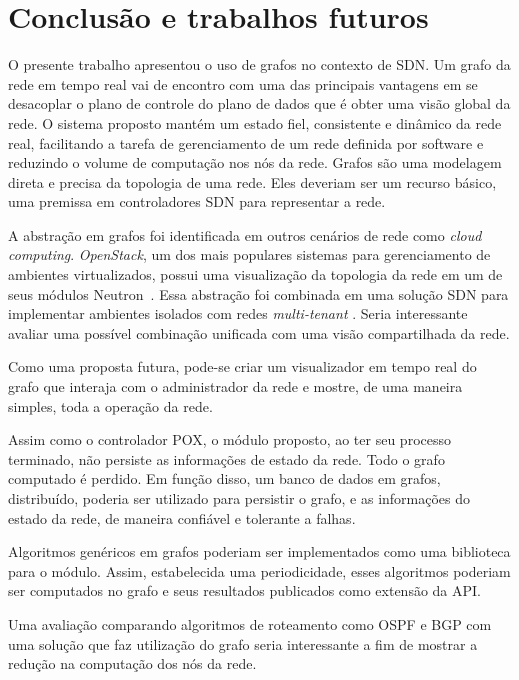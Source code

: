 \chapter{Conclusão e trabalhos futuros}

O presente trabalho apresentou o uso de grafos no contexto de SDN.
Um grafo da rede em tempo real vai de encontro com uma das principais 
vantagens em se desacoplar o plano de controle do plano de dados que é obter 
uma visão global da rede.
O sistema proposto mantém um estado fiel, consistente e dinâmico da rede real, 
facilitando a tarefa de gerenciamento de um rede definida por software e 
reduzindo o volume de computação nos nós da rede.
Grafos são uma modelagem direta e precisa da topologia de uma rede. 
Eles deveriam ser um recurso básico, uma premissa em controladores SDN para 
representar a rede.

A abstração em grafos foi identificada em outros cenários de rede como 
\emph{cloud computing}. 
\emph{OpenStack}, um dos mais populares sistemas para gerenciamento de 
ambientes virtualizados, possui uma visualização da topologia da rede
em um de seus módulos Neutron~\citep{openstacksite}.
Essa abstração foi combinada em uma solução SDN para implementar ambientes 
isolados com redes \emph{multi-tenant} \citep{lcn2013}.
Seria interessante avaliar uma possível combinação unificada com uma visão
compartilhada da rede.

Como uma proposta futura, pode-se criar um visualizador em tempo real do grafo 
que interaja com o administrador da rede e mostre, de uma maneira simples, 
toda a operação da rede.

Assim como o controlador POX, o módulo proposto, ao ter seu processo terminado,
não persiste as informações de estado da rede.
Todo o grafo computado é perdido.
Em função disso, um banco de dados em grafos, distribuído, poderia ser 
utilizado para persistir o grafo, e as informações do estado da rede, de 
maneira confiável e tolerante a falhas. 

Algoritmos genéricos em grafos poderiam ser implementados como uma biblioteca
para o módulo.
Assim, estabelecida uma periodicidade, esses algoritmos poderiam ser computados
no grafo e seus resultados publicados como extensão da API.

Uma avaliação comparando algoritmos de roteamento como OSPF e BGP com uma 
solução que faz utilização do grafo seria interessante a fim de mostrar a 
redução na computação dos nós da rede.

